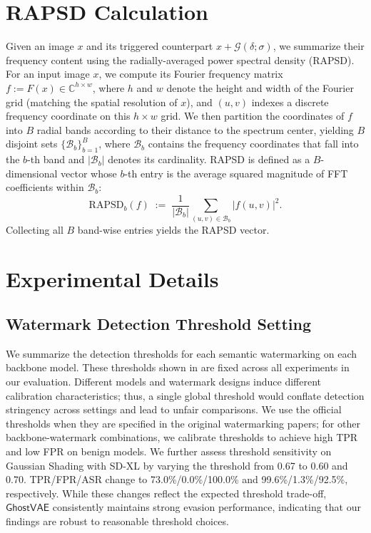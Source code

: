 \documentclass[letterpaper,twocolumn,10pt]{article}
\newcommand{\mg}{$\mathsf{GhostVAE}$\xspace}
\begin{document}




\appendix

\section{RAPSD Calculation}
\label{appendix: rapsd}

Given an image $x$ and its triggered counterpart $x+\mathcal{G}(\delta;\sigma)$, we summarize their frequency content using the radially-averaged power spectral density (RAPSD).
For an input image $x$, we compute its Fourier frequency matrix
$f := F(x)\in\mathbb{C}^{h\times w}$,
where $h$ and $w$ denote the height and width of the Fourier grid (matching the spatial resolution of $x$), and $(u,v)$ indexes a discrete frequency coordinate on this $h\times w$ grid.
We then partition the coordinates of $f$ into $B$ radial bands according to their distance to the spectrum center, yielding $B$ disjoint sets
$\{\mathcal{B}_b\}_{b=1}^{B}$, where $\mathcal{B}_b$ contains the frequency coordinates that fall into the $b$-th band and $|\mathcal{B}_b|$ denotes its cardinality.
RAPSD is defined as a $B$-dimensional vector whose $b$-th entry is the average squared magnitude of FFT coefficients within $\mathcal{B}_b$:
\begin{equation}
\mathrm{RAPSD}_b(f)
\;:=\;
\frac{1}{|\mathcal{B}_b|}
\sum_{(u,v)\in\mathcal{B}_b} |f(u,v)|^2.
\label{eq:rapsd_def}
\end{equation}
Collecting all $B$ band-wise entries yields the RAPSD vector.




\section{Experimental Details}

\subsection{Watermark Detection Threshold Setting}
\label{appendix: threshold-setting}
We summarize the detection thresholds for each semantic watermarking on each backbone model.
These thresholds shown in  are fixed across all experiments in our evaluation.
Different models and watermark designs induce different calibration characteristics; thus, a single global threshold would conflate detection stringency across settings and lead to unfair comparisons.
We use the official thresholds when they are specified in the original watermarking papers; for other backbone-watermark combinations, we calibrate thresholds to achieve high TPR and low FPR on benign models. We further assess threshold sensitivity on Gaussian Shading with SD-XL by varying the threshold from 0.67 to 0.60 and 0.70. TPR/FPR/ASR change to 73.0\%/0.0\%/100.0\% and 99.6\%/1.3\%/92.5\%, respectively. While these changes reflect the expected threshold trade-off, \mg consistently maintains strong evasion performance, indicating that our findings are robust to reasonable threshold choices.
\end{document}
